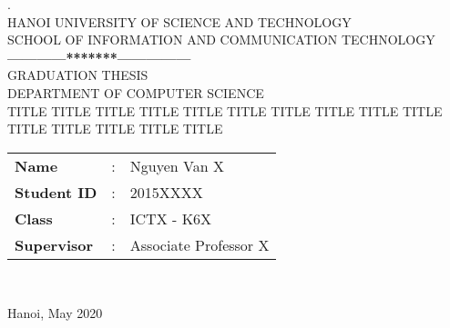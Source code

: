 \thispagestyle{empty}
\thisfancypage{
  \setlength{\fboxrule}{1pt}
  \doublebox}{}
\begin{center}

{
. \\
{\fontsize{12}{12}\selectfont HANOI UNIVERSITY OF SCIENCE AND TECHNOLOGY\\ SCHOOL OF INFORMATION AND COMMUNICATION TECHNOLOGY}\\
\textbf{------------*******---------------}\\[3cm]

{\fontsize{25}{43}\selectfont GRADUATION THESIS}\\[0.1cm]
{\fontsize{17}{10}\selectfont DEPARTMENT OF COMPUTER SCIENCE}\\[0.9cm]
{\fontsize{20}{24}\selectfont TITLE TITLE TITLE TITLE TITLE TITLE TITLE TITLE TITLE TITLE TITLE TITLE TITLE TITLE TITLE}\\[2.5cm]

\begin{tabular}{l c l}
  \textbf{Name} & : & Nguyen Van X \\ 
  \textbf{Student ID} & : & 2015XXXX  \\ 
  \textbf{Class} & : & ICTX - K6X  \\
  \textbf{Supervisor} & : &  Associate Professor X  \\
\end{tabular} \\[2.5cm]
}

\fontsize{17}{19}\selectfont Hanoi, May 2020
\end{center}
\pagebreak